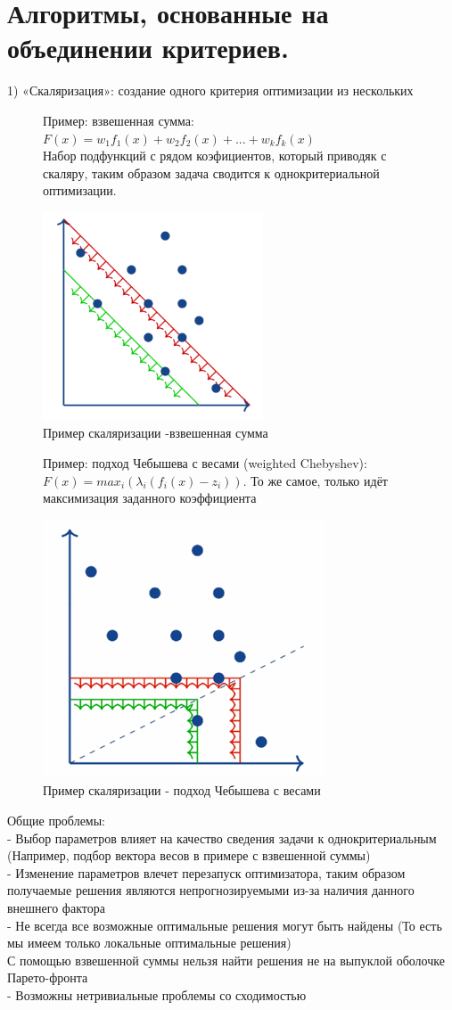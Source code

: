 \section{Алгоритмы, основанные на объединении критериев.}
1) «Скаляризация»: создание одного критерия оптимизации из нескольких
\begin{figure}[h]
Пример: взвешенная сумма: $F(x) = w_{1}f_{1}(x) + w_{2}f_{2}(x) + ...+ w_{k} f_{k} (x)$\\
Набор подфункций с рядом коэфициентов, который приводяк с скаляру, таким образом задача сводится к однокритериальной оптимизации.
\begin{center}
    \includegraphics[width=0.35\linewidth]{images/Scalar.PNG}
    \caption{Пример скаляризации -взвешенная сумма}
    \label{fig:mpr}
\end{center}
\end{figure}
\begin{figure}[h]
Пример: подход Чебышева с весами (weighted Chebyshev):\\
$F(x) = max_{i} (\lambda_{i}(f_{i}(x) {-} z_{i})).$ То же самое, только идёт максимизация заданного коэффициента
\begin{center}
    \includegraphics[width=0.35\linewidth]{images/Scalar_Chebyshev.PNG}
    \caption{Пример скаляризации - подход Чебышева с весами}
    \label{fig:mpr}
\end{center}
\end{figure}

Общие проблемы:\\
- Выбор параметров влияет на качество сведения задачи к однокритериальным (Например, подбор вектора весов в примере с взвешенной суммы)\\
- Изменение параметров влечет перезапуск оптимизатора, таким образом получаемые решения являются непрогнозируемыми из-за наличия данного внешнего фактора\\
- Не всегда все возможные оптимальные решения могут быть найдены (То есть мы имеем только локальные оптимальные решения)\\
С помощью взвешенной суммы нельзя найти решения не на выпуклой оболочке Парето-фронта\\
- Возможны нетривиальные проблемы со сходимостью\\

